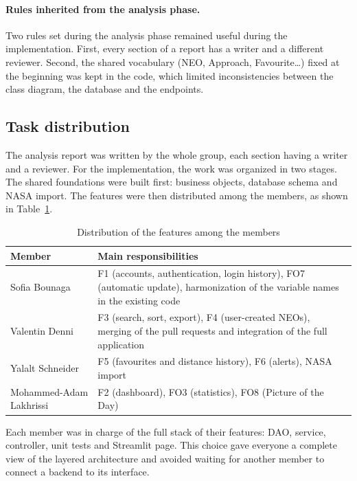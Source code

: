 \paragraph{Rules inherited from the analysis phase.} Two rules set during the analysis phase remained useful during the implementation. First, every section of a report has a writer and a different reviewer. Second, the shared vocabulary (NEO, Approach, Favourite\ldots) fixed at the beginning was kept in the code, which limited inconsistencies between the class diagram, the database and the endpoints.

\subsection{Task distribution}

The analysis report was written by the whole group, each section having a writer and a reviewer. For the implementation, the work was organized in two stages. The shared foundations were built first: business objects, database schema and NASA import. The features were then distributed among the members, as shown in Table~\ref{tab:tasks}.

\begin{table}[H]
\centering
\begin{tabularx}{\textwidth}{lX}
\toprule
\textbf{Member} & \textbf{Main responsibilities} \\
\midrule
Sofia Bounaga & F1 (accounts, authentication, login history), FO7 (automatic update), harmonization of the variable names in the existing code \\
Valentin Denni & F3 (search, sort, export), F4 (user-created NEOs), merging of the pull requests and integration of the full application \\
Yalalt Schneider & F5 (favourites and distance history), F6 (alerts), NASA import \\
Mohammed-Adam Lakhrissi & F2 (dashboard), FO3 (statistics), FO8 (Picture of the Day) \\
\bottomrule
\end{tabularx}
\caption{Distribution of the features among the members}
\label{tab:tasks}
\end{table}

Each member was in charge of the full stack of their features: DAO, service, controller, unit tests and Streamlit page. This choice gave everyone a complete view of the layered architecture and avoided waiting for another member to connect a backend to its interface.


